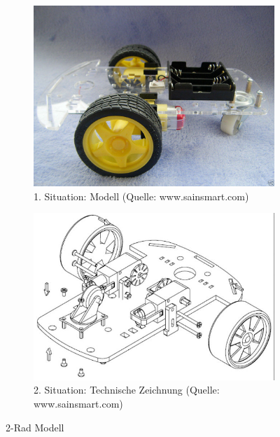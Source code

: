 \begin{figure} [hbp]
	\centering
	\begin{subfigure}[b]{0.4\textwidth}
		\includegraphics[width=\textwidth]{fig/3rad-1.jpg}
		\caption{1. Situation: Modell 
		(Quelle: www.sainsmart.com)}
	\end{subfigure}
	\hfill
	\begin{subfigure}[b]{0.36\textwidth}
		\includegraphics[width=\textwidth]{fig/3rad-3.JPG}
		\caption{2. Situation: Technische Zeichnung
		(Quelle: www.sainsmart.com)}
\end{subfigure}
	\caption{2-Rad Modell}\label{fig:animals}
\end{figure}

